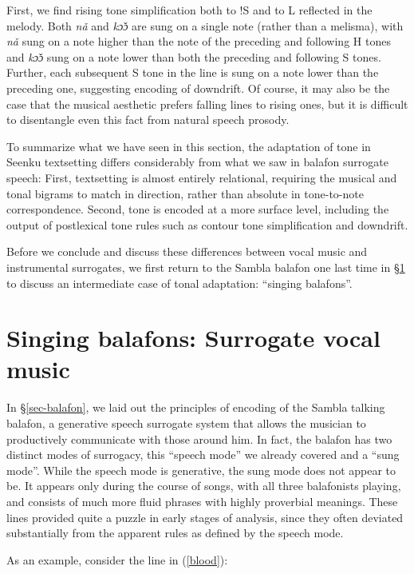 \documentclass[output=paper]{langscibook}
\begin{document}
First, we find rising tone simplification both to !S and to L reflected in the melody. Both \textit{nǎ} and \textit{kɔ̌ɔ} are sung on a single note (rather than a melisma), with \textit{nǎ} sung on a note higher than the note of the preceding and following H tones and \textit{kɔ̌ɔ} sung on a note lower than both the preceding and following S tones. Further, each subsequent S tone in the line is sung on a note lower than the preceding one, suggesting encoding of downdrift. Of course, it may also be the case that the musical aesthetic prefers falling lines to rising ones, but it is difficult to disentangle even this fact from natural speech prosody. 

To summarize what we have seen in this section, the adaptation of tone in Seenku textsetting differs considerably from what we saw in balafon surrogate speech: First, textsetting is almost entirely relational, requiring the musical and tonal bigrams to match in direction, rather than absolute in tone-to-note correspondence. Second, tone is encoded at a more surface level, including the output of postlexical tone rules such as contour tone simplification and downdrift. 

Before we conclude and discuss these differences between vocal music and instrumental surrogates, we first return to the Sambla balafon one last time in \S\ref{sec-surrogate-vocal} to discuss an intermediate case of tonal adaptation: ``singing balafons''. 

\section{Singing balafons: Surrogate vocal music}\label{sec-surrogate-vocal}

In \S\ref{sec-balafon}, we laid out the principles of encoding of the Sambla talking balafon, a generative speech surrogate system that allows the musician to productively communicate with those around him. In fact, the balafon has two distinct modes of surrogacy, this ``speech mode'' we already covered and a ``sung mode''.  While the speech mode is generative, the sung mode does not appear to be. It appears only during the course of songs, with all three balafonists playing, and consists of much more fluid phrases with highly proverbial meanings. These lines provided quite a puzzle in early stages of analysis, since they often deviated substantially from the apparent rules as defined by the speech mode.

As an example, consider the line in (\ref{blood}): 
\end{document}
